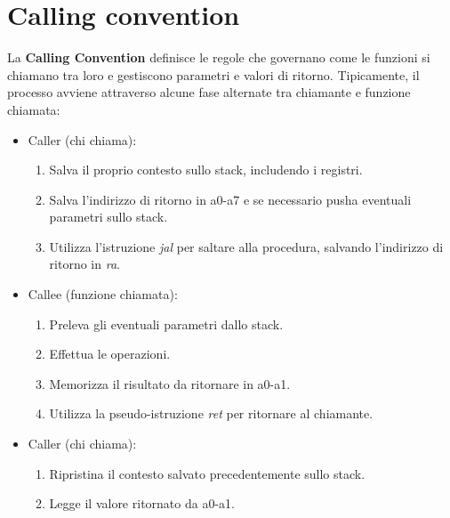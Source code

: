 \section{Calling convention}
La \textbf{Calling Convention} definisce le regole che governano come le funzioni si chiamano tra loro e gestiscono parametri e valori di ritorno. Tipicamente, il processo avviene attraverso alcune fase alternate tra chiamante e funzione chiamata:
\begin{itemize}
	\item Caller (chi chiama):
	\begin{enumerate}
		\item Salva il proprio contesto sullo stack, includendo i registri.
		\item Salva l'indirizzo di ritorno in a0-a7 e se necessario pusha eventuali parametri sullo stack.
		\item Utilizza l'istruzione \textit{jal} per saltare alla procedura, salvando l'indirizzo di ritorno in \textit{ra}.
	\end{enumerate}
	\item Callee (funzione chiamata):
	\begin{enumerate}
		\item Preleva gli eventuali parametri dallo stack.
		\item Effettua le operazioni.
		\item Memorizza il risultato da ritornare in a0-a1.
		\item Utilizza la pseudo-istruzione \textit{ret} per ritornare al chiamante.
	\end{enumerate}
	\item Caller (chi chiama):
		\begin{enumerate}
		\item Ripristina il contesto salvato precedentemente sullo stack.
		\item Legge il valore ritornato da a0-a1.
	\end{enumerate}
\end{itemize}

